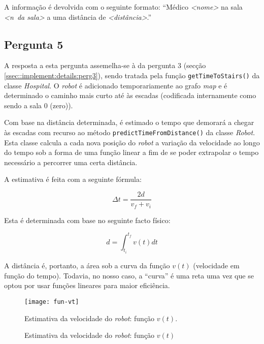 A informação é devolvida com o seguinte formato: ``Médico \textit{<nome>} na sala \textit{<n\textordmasculine~da sala>} a uma distância de \textit{<distância>}.''


\subsection{Pergunta 5}
\label{ssec::implement:details:perg5}


A resposta a esta pergunta assemelha-se à da pergunta 3 (secção \ref{ssec::implement:details:perg3}), sendo tratada pela função \texttt{getTimeToStairs()} da classe \textit{Hospital}. O \textit{robot} é adicionado temporariamente ao grafo \textit{map} e é determinado o caminho mais curto até às escadas (codificada internamente como sendo a sala 0 (zero)).

Com base na distância determinada, é estimado o tempo que demorará a chegar às escadas com recurso ao método \texttt{predictTimeFromDistance()} da classe \textit{Robot}. Esta classe calcula a cada nova posição do \textit{robot} a variação da velocidade ao longo do tempo sob a forma de uma função linear a fim de se poder extrapolar o tempo necessário a percorrer uma certa distância.

A estimativa é feita com a seguinte fórmula:

\begin{equation}
    \Delta t = \frac{2d}{v_f + v_i}
    \label{eq::time_from_distance}
\end{equation}

Esta é determinada com base no seguinte facto físico:

\begin{equation}
    d = \int_{t_i}^{t_f}{v(t)dt}
\end{equation}

A distância é, portanto, a área sob a curva da função $v(t)$ (velocidade em função do tempo). Todavia, no nosso caso, a ``curva'' é uma reta uma vez que se optou por usar funções lineares para maior eficiência.

\begin{figure}[!hbtp]
    \centering
    \texttt{[image: fun-vt]}
    \caption{Estimativa da velocidade do \textit{robot}: função $v(t)$}{Estimativa da velocidade do \textit{robot}: função $v(t)$.}
    \label{fig::fun_vt}
\end{figure}


